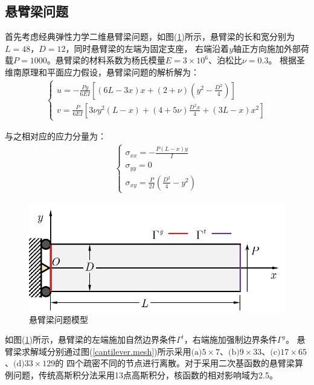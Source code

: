 \subsection{悬臂梁问题}
首先考虑经典弹性力学二维悬臂梁问题，如图(\ref{cantilever})所示，悬臂梁的长和宽分别为$L=48$，$D=12$，同时悬臂梁的左端为固定支座，
右端沿着$y$轴正方向施加外部荷载$P=1000$。悬臂梁的材料系数为杨氏模量$E=3\times10^6$、泊松比$\nu=0.3$。
根据圣维南原理和平面应力假设，悬臂梁问题的解析解为：
\begin{equation}
\begin{split}
\begin{cases}
    u = -\frac{Py}{6EI}[(6L-3x)x + (2+\nu)(y^2 - \frac{D^2}{4})] \\
    v = \frac{P}{6EI}[3\nu y^2(L-x) + (4+5\nu)\frac{D^2x}{4} + (3L-x)x^2]
\end{cases}
\end{split}
\end{equation}\par
与之相对应的应力分量为：
\begin{equation}
\begin{split}
\begin{cases}
   \sigma_{xx}=-\frac{P(L-x)y}{I}\\
   \sigma_{yy}=0\\
   \sigma_{xy}=\frac{P}{2I}(\frac{D^2}{4}-y^2)
\end{cases}
\end{split}
\end{equation}
\begin{figure}[H]
    \centering
    \includegraphics[scale=0.7]{figure/E/cantilever/cantilever.png}
    \caption{悬臂梁问题模型}\label{cantilever}
\end{figure}
如图(\ref{cantilever})所示，悬臂梁的左端施加自然边界条件$\Gamma^t$，右端施加强制边界条件$\Gamma^g$。
悬臂梁求解域分别通过图(\ref{cantilever.mesh})所示采用$\text{(a)}5\times7$、$\text{(b)}9\times33$、$\text{(c)}17\times65$、$\text{(d)}33\times129$的
四个疏密不同的节点进行离散。对于采用二次基函数的悬臂梁算例问题，传统高斯积分法采用13点高斯积分，核函数的相对影响域为2.5。
